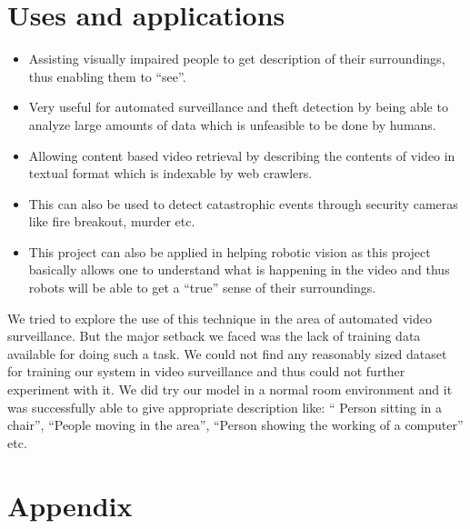 \documentclass[12pt]{article}
\begin{document}
	\section{Uses and applications}
			\begin{itemize}
				\item
					Assisting visually impaired people to get description of their surroundings, thus enabling them to ``see''.
				\item
					Very useful for automated surveillance and theft detection by being able to analyze large amounts of data which is unfeasible to be done by humans.
				\item
					Allowing content based video retrieval by describing the contents of video in textual format which is indexable by web crawlers.
				\item
					This can also be used to detect catastrophic events through security cameras like fire breakout, murder etc.
				\item
					This project can also be applied in helping robotic vision as this project basically allows one to understand what is happening in the video and thus robots will be able to get a ``true'' sense of their surroundings.
			\end{itemize}
			We tried to explore the use of this technique in the area of automated video surveillance. But the major setback
			we faced was the lack of training data available for doing such a task. We could not find any reasonably sized
			dataset for training our system in video surveillance and thus could not further experiment with it. We did try
			our model in a normal room environment and it was successfully able to give appropriate description like: ``
			Person sitting in a chair'', ``People moving in the area'', ``Person showing the working of a computer'' etc.

	\section{Appendix} 
\end{document}
